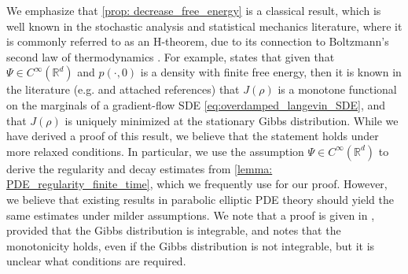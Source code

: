 \documentclass[twoside]{article}
\newcommand{\R} {\mathbb R}
\begin{document}
We emphasize that \cref{prop: decrease_free_energy} is a classical result, which is well known in the stochastic analysis and statistical mechanics literature, where it is commonly referred to as an H-theorem, due to its connection to Boltzmann's second law of thermodynamics \citep{chafai2015boltzmann}. For example, \citep{jordan1998variational} states that given that $\Psi \in C^\infty(\R^d)$ and $p(\cdot,0)$ is a density with finite free energy, then it is known in the literature (e.g. \citep{risken1989fokker} and attached references) that $J(\rho)$ is a monotone functional on the marginals of a gradient-flow SDE \eqref{eq:overdamped_langevin_SDE}, and that $J(\rho)$ is uniquely minimized at the stationary Gibbs distribution. While we have derived a proof of this result, we believe that the statement holds under more relaxed conditions. In particular, we use the assumption $\Psi \in C^\infty(\R^d)$ to derive the regularity and decay estimates from \cref{lemma: PDE_regularity_finite_time}, which we frequently use for our proof. However, we believe that existing results in parabolic elliptic PDE theory should yield the same estimates under milder assumptions. We note that a proof is given in \citep[Sec. 1.7]{chafai2015boltzmann}, provided that the Gibbs distribution is integrable, and \citep{jordan1998variational} notes that the monotonicity holds, even if the Gibbs distribution is not integrable, but it is unclear what conditions are required. 
\end{document}
